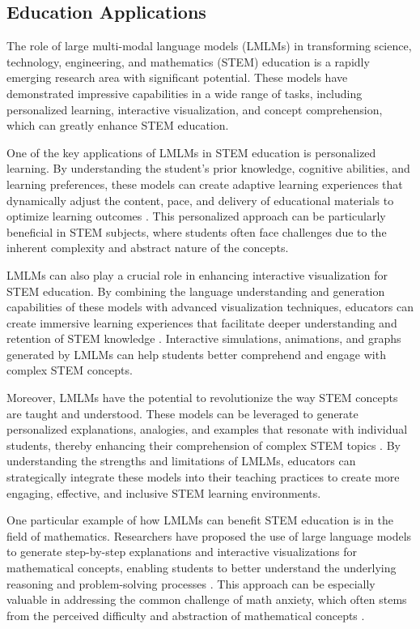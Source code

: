 \documentclass[11pt]{article}
\begin{document}
\subsection{Education Applications}

The role of large multi-modal language models (LMLMs) in transforming science, technology, engineering, and mathematics (STEM) education is a rapidly emerging research area with significant potential. These models have demonstrated impressive capabilities in a wide range of tasks, including personalized learning, interactive visualization, and concept comprehension, which can greatly enhance STEM education.

One of the key applications of LMLMs in STEM education is personalized learning. By understanding the student's prior knowledge, cognitive abilities, and learning preferences, these models can create adaptive learning experiences that dynamically adjust the content, pace, and delivery of educational materials to optimize learning outcomes \cite{ref206}. This personalized approach can be particularly beneficial in STEM subjects, where students often face challenges due to the inherent complexity and abstract nature of the concepts.

LMLMs can also play a crucial role in enhancing interactive visualization for STEM education. By combining the language understanding and generation capabilities of these models with advanced visualization techniques, educators can create immersive learning experiences that facilitate deeper understanding and retention of STEM knowledge \cite{ref73}. Interactive simulations, animations, and graphs generated by LMLMs can help students better comprehend and engage with complex STEM concepts.

Moreover, LMLMs have the potential to revolutionize the way STEM concepts are taught and understood. These models can be leveraged to generate personalized explanations, analogies, and examples that resonate with individual students, thereby enhancing their comprehension of complex STEM topics \cite{ref74}. By understanding the strengths and limitations of LMLMs, educators can strategically integrate these models into their teaching practices to create more engaging, effective, and inclusive STEM learning environments.

One particular example of how LMLMs can benefit STEM education is in the field of mathematics. Researchers have proposed the use of large language models to generate step-by-step explanations and interactive visualizations for mathematical concepts, enabling students to better understand the underlying reasoning and problem-solving processes \cite{ref207}. This approach can be especially valuable in addressing the common challenge of math anxiety, which often stems from the perceived difficulty and abstraction of mathematical concepts \cite{ref208}.
\end{document}
